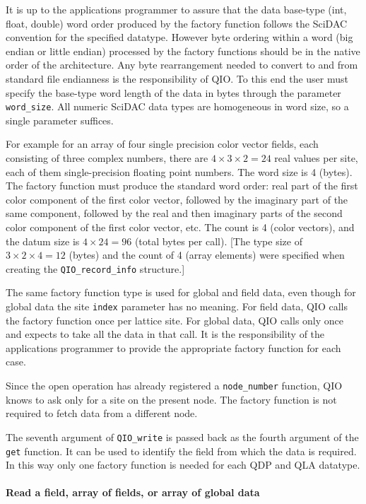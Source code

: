 \documentclass{article}
\begin{document}
It is up to the applications programmer to assure that the data
base-type (int, float, double) word order produced by the factory
function follows the SciDAC convention for the specified datatype.
However byte ordering within a word (big endian or little endian)
processed by the factory functions should be in the native order of
the architecture.  Any byte rearrangement needed to convert to and
from standard file endianness is the responsibility of QIO.  To this
end the user must specify the base-type word length of the data in
bytes through the parameter \verb|word_size|.  All numeric SciDAC data
types are homogeneous in word size, so a single parameter
suffices.

For example for an array of four single precision color vector fields,
each consisting of three complex numbers, there are $4 \times 3 \times
2 = 24$ real values per site, each of them single-precision floating
point numbers.  The word size is 4 (bytes).  The factory function must
produce the standard word order: real part of the first color
component of the first color vector, followed by the imaginary part of
the same component, followed by the real and then imaginary parts of
the second color component of the first color vector, etc. The count
is 4 (color vectors), and the datum size is $4 \times 24 = 96$ (total
bytes per call).  [The type size of $3 \times 2 \times 4 = 12$ (bytes)
and the count of 4 (array elements) were specified when creating the
\verb|QIO_record_info| structure.]

The same factory function type is used for global and field data, even
though for global data the site \verb|index| parameter has no meaning.
For field data, QIO calls the factory function once per lattice site.
For global data, QIO calls only once and expects to take all the data
in that call.  It is the responsibility of the applications programmer
to provide the appropriate factory function for each case.

Since the open operation has already registered a \verb|node_number|
function, QIO knows to ask only for a site on the present node.  The
factory function is not required to fetch data from a different node.

The seventh argument of \verb|QIO_write| is passed back as the fourth
argument of the \verb|get| function.  It can be used to identify the
field from which the data is required.  In this way only one factory
function is needed for each QDP and QLA datatype.

\paragraph{Read a field, array of fields, or array of global data}
\end{document}
